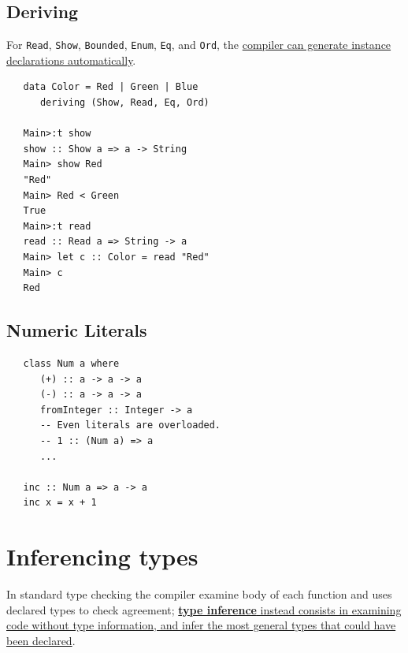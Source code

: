 \subsection{Deriving}
For \lstinline|Read|, \lstinline|Show|, \lstinline|Bounded|, \lstinline|Enum|, \lstinline|Eq|, and \lstinline|Ord|, the \ul{compiler can generate instance declarations automatically}.
\begin{lstlisting}
   data Color = Red | Green | Blue
      deriving (Show, Read, Eq, Ord)
   
   Main>:t show
   show :: Show a => a -> String
   Main> show Red
   "Red"
   Main> Red < Green
   True
   Main>:t read
   read :: Read a => String -> a
   Main> let c :: Color = read "Red"
   Main> c
   Red
\end{lstlisting}

\subsection{Numeric Literals}
\begin{lstlisting}
   class Num a where
      (+) :: a -> a -> a
      (-) :: a -> a -> a
      fromInteger :: Integer -> a
      -- Even literals are overloaded.
      -- 1 :: (Num a) => a
      ...

   inc :: Num a => a -> a
   inc x = x + 1
\end{lstlisting}



\section{Inferencing types}
In standard type checking the compiler examine body of each function and uses declared types to check agreement;
\ul{\textbf{type inference} instead consists in examining code without type information, and infer the
most general types that could have been declared}.

